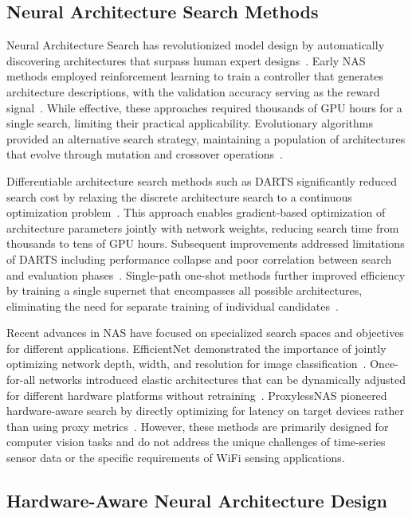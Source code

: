 \documentclass[journal]{IEEEtran}
\begin{document}
\subsection{Neural Architecture Search Methods}

Neural Architecture Search has revolutionized model design by automatically discovering architectures that surpass human expert designs~\cite{nas2019survey}. Early NAS methods employed reinforcement learning to train a controller that generates architecture descriptions, with the validation accuracy serving as the reward signal~\cite{nasrl2017}. While effective, these approaches required thousands of GPU hours for a single search, limiting their practical applicability. Evolutionary algorithms provided an alternative search strategy, maintaining a population of architectures that evolve through mutation and crossover operations~\cite{evolution2019nas}.

Differentiable architecture search methods such as DARTS significantly reduced search cost by relaxing the discrete architecture search to a continuous optimization problem~\cite{darts2019}. This approach enables gradient-based optimization of architecture parameters jointly with network weights, reducing search time from thousands to tens of GPU hours. Subsequent improvements addressed limitations of DARTS including performance collapse and poor correlation between search and evaluation phases~\cite{gdas2020, pcdarts2020}. Single-path one-shot methods further improved efficiency by training a single supernet that encompasses all possible architectures, eliminating the need for separate training of individual candidates~\cite{oneshot2020}.

Recent advances in NAS have focused on specialized search spaces and objectives for different applications. EfficientNet demonstrated the importance of jointly optimizing network depth, width, and resolution for image classification~\cite{efficientnet2019}. Once-for-all networks introduced elastic architectures that can be dynamically adjusted for different hardware platforms without retraining~\cite{ofa2020}. ProxylessNAS pioneered hardware-aware search by directly optimizing for latency on target devices rather than using proxy metrics~\cite{proxyless2019}. However, these methods are primarily designed for computer vision tasks and do not address the unique challenges of time-series sensor data or the specific requirements of WiFi sensing applications.

\subsection{Hardware-Aware Neural Architecture Design}
\end{document}

